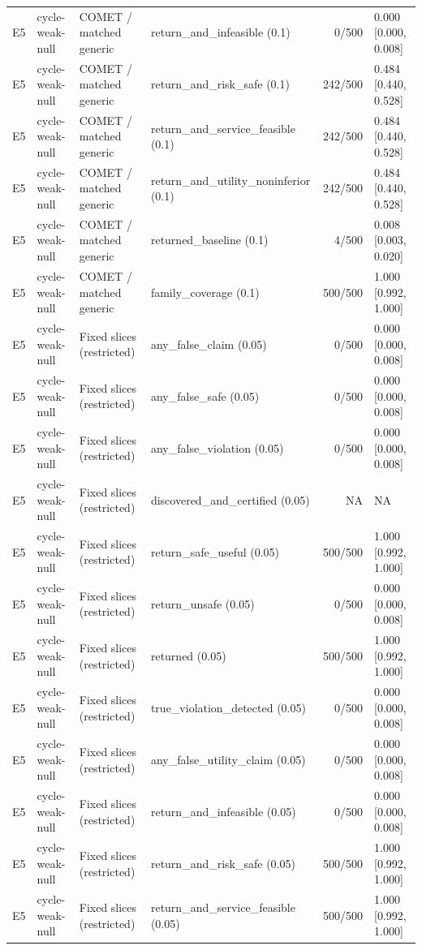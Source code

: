 \begin{longtable}{p{.04\linewidth}p{.18\linewidth}p{.19\linewidth}p{.16\linewidth}r p{.21\linewidth}}
E5 & cycle-weak-null & COMET / matched generic & return\_and\_infeasible (0.1) & 0/500 & 0.000 [0.000, 0.008]\\
E5 & cycle-weak-null & COMET / matched generic & return\_and\_risk\_safe (0.1) & 242/500 & 0.484 [0.440, 0.528]\\
E5 & cycle-weak-null & COMET / matched generic & return\_and\_service\_feasible (0.1) & 242/500 & 0.484 [0.440, 0.528]\\
E5 & cycle-weak-null & COMET / matched generic & return\_and\_utility\_noninferior (0.1) & 242/500 & 0.484 [0.440, 0.528]\\
E5 & cycle-weak-null & COMET / matched generic & returned\_baseline (0.1) & 4/500 & 0.008 [0.003, 0.020]\\
E5 & cycle-weak-null & COMET / matched generic & family\_coverage (0.1) & 500/500 & 1.000 [0.992, 1.000]\\
E5 & cycle-weak-null & Fixed slices (restricted) & any\_false\_claim (0.05) & 0/500 & 0.000 [0.000, 0.008]\\
E5 & cycle-weak-null & Fixed slices (restricted) & any\_false\_safe (0.05) & 0/500 & 0.000 [0.000, 0.008]\\
E5 & cycle-weak-null & Fixed slices (restricted) & any\_false\_violation (0.05) & 0/500 & 0.000 [0.000, 0.008]\\
E5 & cycle-weak-null & Fixed slices (restricted) & discovered\_and\_certified (0.05) & NA & NA\\
E5 & cycle-weak-null & Fixed slices (restricted) & return\_safe\_useful (0.05) & 500/500 & 1.000 [0.992, 1.000]\\
E5 & cycle-weak-null & Fixed slices (restricted) & return\_unsafe (0.05) & 0/500 & 0.000 [0.000, 0.008]\\
E5 & cycle-weak-null & Fixed slices (restricted) & returned (0.05) & 500/500 & 1.000 [0.992, 1.000]\\
E5 & cycle-weak-null & Fixed slices (restricted) & true\_violation\_detected (0.05) & 0/500 & 0.000 [0.000, 0.008]\\
E5 & cycle-weak-null & Fixed slices (restricted) & any\_false\_utility\_claim (0.05) & 0/500 & 0.000 [0.000, 0.008]\\
E5 & cycle-weak-null & Fixed slices (restricted) & return\_and\_infeasible (0.05) & 0/500 & 0.000 [0.000, 0.008]\\
E5 & cycle-weak-null & Fixed slices (restricted) & return\_and\_risk\_safe (0.05) & 500/500 & 1.000 [0.992, 1.000]\\
E5 & cycle-weak-null & Fixed slices (restricted) & return\_and\_service\_feasible (0.05) & 500/500 & 1.000 [0.992, 1.000]\\

\end{longtable}
